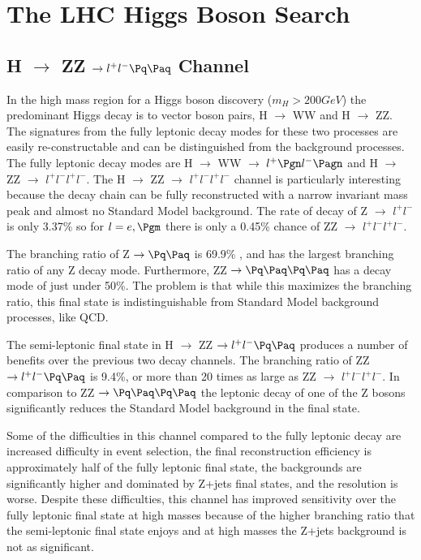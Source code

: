 
\chapter{The LHC Higgs Boson Search}

\section{H $\rightarrow$ ZZ $\rightarrow l^{+}l^{-} \Pq \Paq$ Channel}
In the high mass region for a Higgs boson discovery ($m_{H} > 200 GeV$) the predominant Higgs decay is to vector boson pairs, H $\rightarrow$ WW and H $\rightarrow$ ZZ.  The signatures from the fully leptonic decay modes for these two processes are easily re-constructable and can be distinguished from the background processes.  The fully leptonic decay modes are H $\rightarrow$ WW $\rightarrow$ $l^{+} \Pgn l^{-} \Pagn$ and H $\rightarrow$ ZZ $\rightarrow$ $l^{+}l^{-}l^{+}l^{-}$. The H $\rightarrow$ ZZ $\rightarrow$ $l^{+}l^{-}l^{+}l^{-}$ channel is particularly interesting because the decay chain can be fully reconstructed with a narrow invariant mass peak and almost no Standard Model background. The rate of decay of Z $\rightarrow$ $l^{+}l^{-}$ is only 3.37\% \cite{PDG2012} so for $ l = e,\Pgm$ there is only a 0.45\% chance of ZZ $\rightarrow$ $l^{+}l^{-}l^{+}l^{-}$.

The branching ratio of Z $\rightarrow \Pq \Paq$ is 69.9\% \cite{PDG2012}, and has the largest branching ratio of any Z decay mode. Furthermore, ZZ $\rightarrow \Pq \Paq \Pq \Paq$ has a decay mode of just under 50\%. The problem is that while this maximizes the branching ratio, this final state is indistinguishable from Standard Model background processes, like QCD.

The semi-leptonic final state in H $\rightarrow$ ZZ $\rightarrow l^{+}l^{-} \Pq \Paq$ produces a number of benefits over the previous two decay channels.  The branching ratio of ZZ $\rightarrow l^{+}l^{-} \Pq \Paq$ is 9.4\%, or more than 20 times as large as ZZ $\rightarrow$ $l^{+}l^{-}l^{+}l^{-}$.  In comparison to ZZ $\rightarrow \Pq \Paq \Pq \Paq$ the leptonic decay of one of the Z bosons significantly reduces the Standard Model background in the final state.

Some of the difficulties in this channel compared to the fully leptonic decay are increased difficulty in event selection, the final reconstruction efficiency is approximately half of the fully leptonic final state, the backgrounds are significantly higher and dominated by Z+jets final states, and the resolution is worse.  Despite these difficulties, this channel has improved sensitivity over the fully leptonic final state at high masses because of the higher branching ratio that the semi-leptonic final state enjoys and at high masses the Z+jets background is not as significant.

